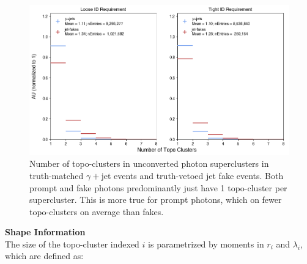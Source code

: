 \begin{figure}[htb]
    \centering
    \includegraphics[width=\textwidth]{chapters/chapter4_photonID/images/hists/y_nTopoClusters.png}
    \caption[Number of topo-clusters in unconverted photon superclusters]
    {Number of topo-clusters in unconverted photon superclusters in truth-matched $\gamma+$jet events and truth-vetoed jet fake events. Both prompt and fake photons predominantly just have 1 topo-cluster per supercluster. This is more true for prompt photons, which on fewer topo-clusters on average than fakes.} 
    \label{fig:num-clusters}
\end{figure}


\noindent\textbf{Shape Information}\\
\indent The size of the topo-cluster indexed $i$ is parametrized by moments in $r_i$ and $\lambda_i$, which are defined as:

